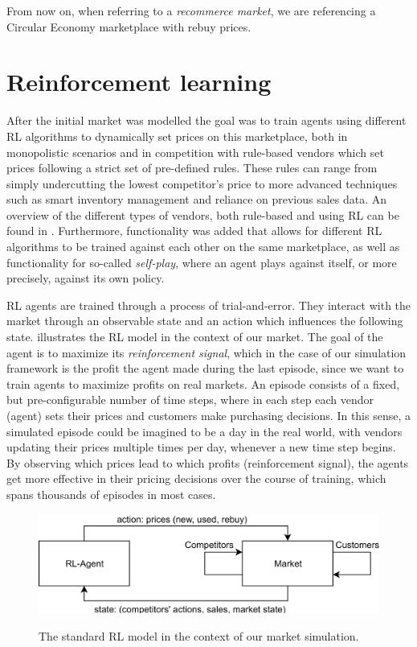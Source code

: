 From now on, when referring to a \emph{recommerce market}, we are referencing a Circular Economy marketplace with rebuy prices.

\clearpage
\section{Reinforcement learning}\label{sec:ReinforcementLearningIntroduction}

After the initial market was modelled the goal was to train agents using different RL algorithms to dynamically set prices on this marketplace, both in monopolistic scenarios and in competition with rule-based vendors which set prices following a strict set of pre-defined rules. These rules can range from simply undercutting the lowest competitor's price to more advanced techniques such as smart inventory management and reliance on previous sales data. An overview of the different types of vendors, both rule-based and using RL can be found in . Furthermore, functionality was added that allows for different RL algorithms to be trained against each other on the same marketplace, as well as functionality for so-called \emph{self-play}, where an agent plays against itself, or more precisely, against its own policy.

RL agents are trained through a process of trial-and-error. They interact with the market through an observable state and an action which influences the following state.  illustrates the RL model in the context of our market. The goal of the agent is to maximize its \emph{reinforcement signal}, which in the case of our simulation framework is the profit the agent made during the last episode, since we want to train agents to maximize profits on real markets. An episode consists of a fixed, but pre-configurable number of time steps, where in each step each vendor (agent) sets their prices and customers make purchasing decisions. In this sense, a simulated episode could be imagined to be a day in the real world, with vendors updating their prices multiple times per day, whenever a new time step begins. By observing which prices lead to which profits (reinforcement signal), the agents get more effective in their pricing decisions over the course of training, which spans thousands of episodes in most cases.

\begin{figure}[t]
	\centering
	\includegraphics[width = \textwidth]{images/RL_overview.png}\\
	\caption{The standard RL model in the context of our market simulation.\\ }\label{fig:IntroRLDiagram}
\end{figure}